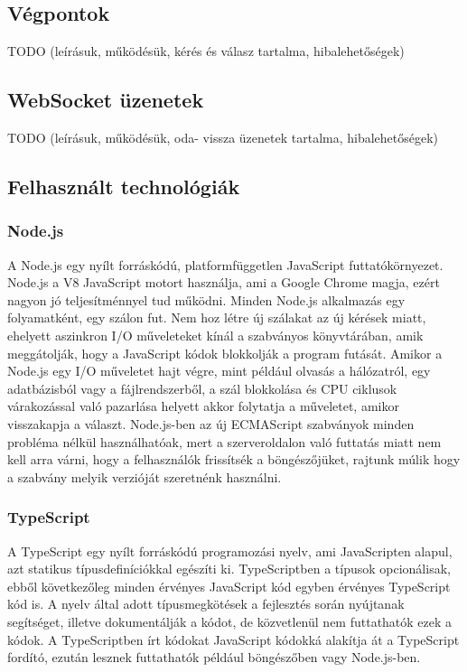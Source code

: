 \documentclass{elteikthesis}
\begin{document}
			\subsection{Végpontok}
			TODO (leírásuk, működésük, kérés és válasz tartalma, hibalehetőségek)
			
			\subsection{WebSocket üzenetek}
			TODO (leírásuk, működésük, oda- vissza üzenetek tartalma, hibalehetőségek)
			
			\subsection{Felhasznált technológiák}				
				\subsubsection{Node.js}
					A Node.js \cite{nodejs} egy nyílt forráskódú, platformfüggetlen JavaScript futtatókörnyezet. Node.js a V8 JavaScript motort használja, ami a Google Chrome magja, ezért nagyon jó teljesítménnyel tud működni. Minden Node.js alkalmazás egy folyamatként, egy szálon fut. Nem hoz létre új szálakat az új kérések miatt, ehelyett aszinkron I/O műveleteket kínál a szabványos könyvtárában, amik meggátolják, hogy a JavaScript kódok blokkolják a program futását. Amikor a Node.js egy I/O műveletet hajt végre, mint például olvasás a hálózatról, egy adatbázisból vagy a fájlrendszerből, a szál blokkolása és CPU ciklusok várakozással való pazarlása helyett akkor folytatja a műveletet, amikor visszakapja a választ. Node.js-ben az új ECMAScript szabványok minden probléma nélkül használhatóak, mert a szerveroldalon való futtatás miatt nem kell arra várni, hogy a felhasználók frissítsék a böngészőjüket, rajtunk múlik hogy a szabvány melyik verzióját szeretnénk használni.
				
				\subsubsection{TypeScript}
					A TypeScript \cite{typescript} egy nyílt forráskódú programozási nyelv, ami JavaScripten alapul, azt statikus típusdefiníciókkal egészíti ki. TypeScriptben a típusok opcionálisak, ebből következőleg minden érvényes JavaScript kód egyben érvényes TypeScript kód is. A nyelv által adott típusmegkötések a fejlesztés során nyújtanak segítséget, illetve dokumentálják a kódot, de közvetlenül nem futtathatók ezek a kódok. A TypeScriptben írt kódokat JavaScript kódokká alakítja át a TypeScript fordító, ezután lesznek futtathatók például böngészőben vagy Node.js-ben.
				
\end{document}
